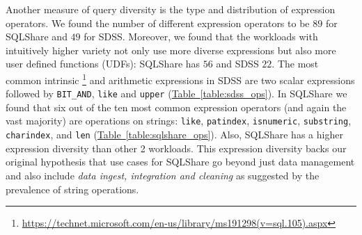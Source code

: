 \documentclass{sig-alternate}
\newcommand{\tabref}[1]{\hyperref[#1]{Table~\ref*{#1}}}
\newcommand{\sqlshare}{SQLShare}
\begin{document}
\label{sec:types_exprs}
Another measure of query diversity is the type and distribution of expression operators.
We found the number of different expression operators to be $89$ for \sqlshare{} and $49$ for SDSS.
Moreover, we found that the workloads with intuitively higher variety not only use more diverse expressions but also more user defined functions (UDFs):
\sqlshare{} has $56$ and SDSS $22$.
The most common intrinsic \footnote{\url{https://technet.microsoft.com/en-us/library/ms191298(v=sql.105).aspx}} and arithmetic expressions in SDSS are two scalar expressions followed by \texttt{BIT\_AND}, \texttt{like} and \texttt{upper} (\tabref{table:sdss_ops}).
In \sqlshare{} we found that six out of the ten most common expression operators (and again the vast majority) are operations on strings: \texttt{like}, \texttt{patindex}, \texttt{isnumeric}, \texttt{substring}, \texttt{charindex}, and \texttt{len} (\tabref{table:sqlshare_ops}).
Also, \sqlshare{} has a higher expression diversity than other 2 workloads.
This expression diversity backs our original hypothesis that use cases for \sqlshare{} go beyond just data management and also include \emph{data ingest, integration and cleaning} as suggested by the prevalence of string operations.
\end{document}
